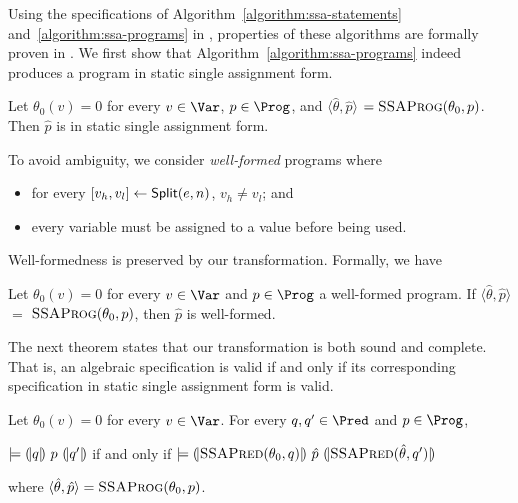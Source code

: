 Using the specifications of Algorithm~\ref{algorithm:ssa-statements}
and~\ref{algorithm:ssa-programs} in \gallina, properties of these
algorithms are formally proven in \coq. We first show that
Algorithm~\ref{algorithm:ssa-programs} indeed 
produces a program in static single assignment form.
\begin{lemma}
  Let $\theta_0(v) = 0$ for every $v \in \Var$, $p \in \Prog$, and
  $\langle \hat{\theta}, \hat{p} \rangle$ $=
  \textsc{SSAProg}(\theta_0, p)$. Then
  $\hat{p}$ is in static single assignment form.
\end{lemma}

To avoid ambiguity, we consider \emph{well-formed} programs where
\begin{itemize}
\item for every ${[}{v_h}, {v_l}{]} \leftarrow \mbox{\textsf{Split}}(e, n)$, $v_h
  \neq v_l$; and
\item every variable must be assigned to a value before being used.
\end{itemize}
Well-formedness is preserved by our transformation. Formally, we have
\begin{lemma}
  Let $\theta_0(v) = 0$ for every $v \in \Var$ and $p \in \Prog$ a
  well-formed program. If $\langle \hat{\theta}, \hat{p} \rangle$ $=$ 
  $\textsc{SSAProg}(\theta_0, p)$, then $\hat{p}$ is well-formed.
\end{lemma}

The next theorem states that our transformation is both sound and
complete. That is, an algebraic specification is valid if and only if its
corresponding specification in static single assignment form is valid.
\begin{theorem}
  Let $\theta_0(v) = 0$ for every $v \in \Var$. For every $q, q' \in \Pred$
  and $p \in \Prog$,
  \begin{center}
    $\models {(\!|}{q}{|\!)}~{p}~{(\!|}{q'}{|\!)}$ if and only if
    $\models {(\!|}{\textsc{SSAPred}(\theta_0, q)}{|\!)}~{\hat{p}}~{(\!|}{\textsc{SSAPred}(\hat{\theta}, q')}{|\!)}$
  \end{center}
  where $\langle \hat{\theta}, \hat{p} \rangle =
  \textsc{SSAProg}(\theta_0, p)$.
  \label{theorem:ssa}
\end{theorem}

